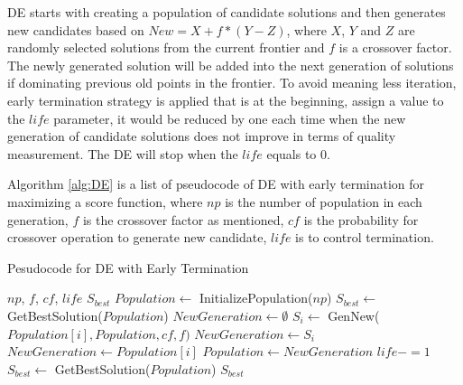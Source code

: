 \documentclass{sig-alternative}
\begin{document}
DE starts with creating a population of candidate solutions and then generates new 
candidates based on $New = X+f*(Y-Z)$, where $X$, $Y$ and $Z$ are randomly selected 
solutions from the current frontier and $f$ is a crossover factor. The newly generated solution 
will be added into the next generation of solutions if dominating previous old points in the 
frontier. To avoid meaning less iteration, early termination strategy is applied that is at the 
beginning, assign a value to the $life$ parameter, it would be reduced by one each time   
when the new generation of candidate solutions does not improve in terms of quality 
measurement. The DE will stop when the $life$ equals to 0.

Algorithm \ref{alg:DE} is a list of pseudocode of DE with early termination for maximizing a 
score function, where $np$ is the number of population in each generation, $f$ is the 
crossover factor as mentioned, $cf$ is the probability for crossover operation to generate new 
candidate, $life$ is to control termination.

\begin{algorithm}
	\caption{Pesudocode for DE with Early Termination}
	\label{alg:DE}
		\begin{algorithmic}[1]
			\Require $np$, $f$, $cf$, $life$
			\Ensure $S_{best}$
		  \State $Population  \gets $ InitializePopulation($np$)
		  \State $S_{best} \gets $GetBestSolution($Population $)
			\State $NewGeneration \gets \emptyset$
				\State $S_i \gets$ GenNew($Population [i], Population , cf, f)$
				 	\State $NewGeneration \gets S_i$
				\Else
					\State $NewGeneration \gets Population [i]$
				\EndIf
			\EndFor
			\State $Population  \gets NewGeneration$
				\State $life -=1$
			\EndIf
			\State $S_{best} \gets$ GetBestSolution($Population $)
		  \EndWhile
		 \State \Return $S_{best}$
                 \end{algorithmic}            
\end{algorithm}

\end{document}
